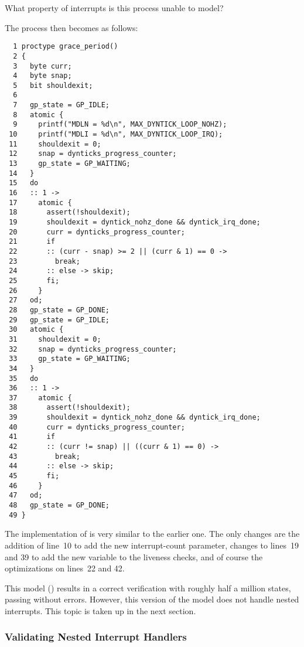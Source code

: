 \QuickQuiz{}
	What property of interrupts is this 
	process unable to model?
 \QuickQuizEnd

The  process then becomes as follows:

{ \scriptsize
\begin{verbatim}
  1 proctype grace_period()
  2 {
  3   byte curr;
  4   byte snap;
  5   bit shouldexit;
  6
  7   gp_state = GP_IDLE;
  8   atomic {
  9     printf("MDLN = %d\n", MAX_DYNTICK_LOOP_NOHZ);
 10     printf("MDLI = %d\n", MAX_DYNTICK_LOOP_IRQ);
 11     shouldexit = 0;
 12     snap = dynticks_progress_counter;
 13     gp_state = GP_WAITING;
 14   }
 15   do
 16   :: 1 ->
 17     atomic {
 18       assert(!shouldexit);
 19       shouldexit = dyntick_nohz_done && dyntick_irq_done;
 20       curr = dynticks_progress_counter;
 21       if
 22       :: (curr - snap) >= 2 || (curr & 1) == 0 ->
 23         break;
 24       :: else -> skip;
 25       fi;
 26     }
 27   od;
 28   gp_state = GP_DONE;
 29   gp_state = GP_IDLE;
 30   atomic {
 31     shouldexit = 0;
 32     snap = dynticks_progress_counter;
 33     gp_state = GP_WAITING;
 34   }
 35   do
 36   :: 1 ->
 37     atomic {
 38       assert(!shouldexit);
 39       shouldexit = dyntick_nohz_done && dyntick_irq_done;
 40       curr = dynticks_progress_counter;
 41       if
 42       :: (curr != snap) || ((curr & 1) == 0) ->
 43         break;
 44       :: else -> skip;
 45       fi;
 46     }
 47   od;
 48   gp_state = GP_DONE;
 49 }
\end{verbatim}
}

The implementation of  is very similar
to the earlier one.
The only changes are the addition of line~10 to add the new
interrupt-count parameter, changes to lines~19 and 39 to
add the new  variable to the liveness
checks, and of course the optimizations on lines~22 and 42.

This model ()
results in a correct verification with roughly half a million
states, passing without errors.
However, this version of the model does not handle nested
interrupts.
This topic is taken up in the next section.

\subsubsection{Validating Nested Interrupt Handlers}
\label{sec:formal:Validating Nested Interrupt Handlers}

